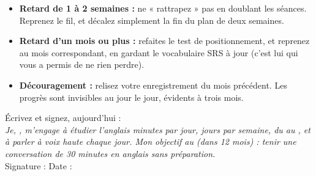 \begin{itemize}
  \item \textbf{Retard de 1 à 2 semaines :} ne « rattrapez » pas en doublant les séances.
  Reprenez le fil, et décalez simplement la fin du plan de deux semaines.
  \item \textbf{Retard d'un mois ou plus :} refaites le test de positionnement, et reprenez
  au mois correspondant, en gardant le vocabulaire SRS à jour (c'est lui qui vous a permis
  de ne rien perdre).
  \item \textbf{Découragement :} relisez votre enregistrement du mois précédent. Les progrès
  sont invisibles au jour le jour, évidents à trois mois.
\end{itemize}

\begin{memo}
Écrivez et signez, aujourd'hui :\\[4pt]
\textit{Je, \trou[5cm], m'engage à étudier l'anglais \trou[1.5cm] minutes par jour,
\trou[1cm] jours par semaine, du \trou[2.5cm] au \trou[2.5cm], et à parler à voix haute
chaque jour. Mon objectif au \trou[2.5cm] (dans 12 mois) : tenir une conversation
de 30 minutes en anglais sans préparation.}\\[4pt]
Signature : \trou[5cm] \hfill Date : \trou[3cm]
\end{memo}
